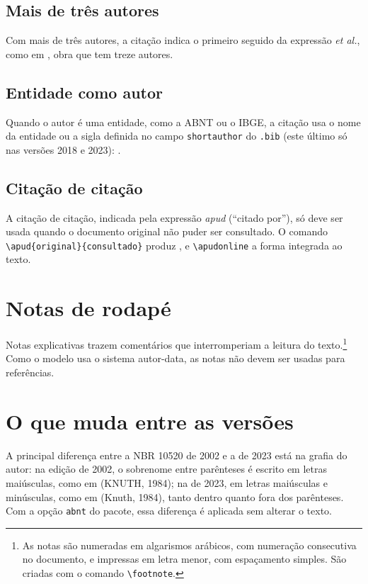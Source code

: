 \subsection{Mais de três autores}

Com mais de três autores, a citação indica o primeiro seguido da expressão \textit{et al.}, como em , obra que tem treze autores.

\subsection{Entidade como autor}

Quando o autor é uma entidade, como a ABNT ou o IBGE, a citação usa o nome da entidade ou a sigla definida no campo \texttt{shortauthor} do \texttt{.bib} (este último só nas versões 2018 e 2023): \cite{ibge1993}.

\subsection{Citação de citação}

A citação de citação, indicada pela expressão \textit{apud} (``citado por''), só deve ser usada quando o documento original não puder ser consultado. O comando \verb|\apud{original}{consultado}| produz , e \verb|\apudonline| a forma integrada ao texto.

\section{Notas de rodapé}\label{sec:notas}

Notas explicativas trazem comentários que interromperiam a leitura do texto.\footnote{As notas são numeradas em algarismos arábicos, com numeração consecutiva no documento, e impressas em letra menor, com espaçamento simples. São criadas com o comando \texttt{\textbackslash footnote}.} Como o modelo usa o sistema autor-data, as notas não devem ser usadas para referências.

\section{O que muda entre as versões}\label{sec:mudancas-citacoes}

A principal diferença entre a NBR 10520 de 2002 \cite{abnt10520-2002} e a de 2023 \cite{abnt10520} está na grafia do autor: na edição de 2002, o sobrenome entre parênteses é escrito em letras maiúsculas, como em (KNUTH, 1984); na de 2023, em letras maiúsculas e minúsculas, como em (Knuth, 1984), tanto dentro quanto fora dos parênteses. Com a opção \texttt{abnt} do pacote, essa diferença é aplicada sem alterar o texto.
